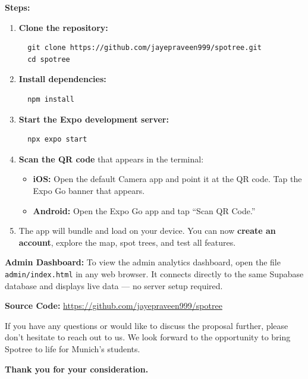\documentclass[11pt,a4paper]{article}
\begin{document}
\textbf{Steps:}
\begin{enumerate}
  \item \textbf{Clone the repository:}
  \begin{verbatim}
  git clone https://github.com/jayepraveen999/spotree.git
  cd spotree
  \end{verbatim}

  \item \textbf{Install dependencies:}
  \begin{verbatim}
  npm install
  \end{verbatim}

  \item \textbf{Start the Expo development server:}
  \begin{verbatim}
  npx expo start
  \end{verbatim}

  \item \textbf{Scan the QR code} that appears in the terminal:
  \begin{itemize}
    \item \textbf{iOS:} Open the default Camera app and point it at the QR code. Tap the Expo Go banner that appears.
    \item \textbf{Android:} Open the Expo Go app and tap ``Scan QR Code.''
  \end{itemize}

  \item The app will bundle and load on your device. You can now \textbf{create an account}, explore the map, spot trees, and test all features.
\end{enumerate}

\textbf{Admin Dashboard:} To view the admin analytics dashboard, open the file \texttt{admin/index.html} in any web browser. It connects directly to the same Supabase database and displays live data --- no server setup required.

\textbf{Source Code:} \url{https://github.com/jayepraveen999/spotree}

\begin{center}
{\small If you have any questions or would like to discuss the proposal further, please don't hesitate to reach out to us. We look forward to the opportunity to bring Spotree to life for Munich's students.}

\vspace{0.5cm}
{\small\bfseries Thank you for your consideration.}
\end{center}
\end{document}

